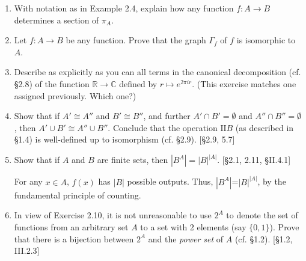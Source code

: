 \begin{enumerate}
    \item With notation as in Example 2.4, explain how any function $f: A \to B$ determines a section of $\pi_A$.

    \item Let $f: A \to B$ be any function. Prove that the graph $\Gamma_f$ of $f$ is isomorphic to $A$.

    \item Describe as explicitly as you can all terms in the canonical decomposition (cf. \S2.8) of the function $\mathbb{R} \to \mathbb{C}$ defined by $r \mapsto e^{2\pi i r}$. (This exercise matches one assigned previously. Which one?)

    \item Show that if $A' \cong A''$ and $B' \cong B''$, and further $A' \cap B' = \emptyset$ and $A'' \cap B'' = \emptyset$, then $A' \cup B' \cong A'' \cup B''$. Conclude that the operation $\text{II}B$ (as described in \S1.4) is well-defined up to isomorphism (cf. \S2.9). [\S2.9, 5.7]

    \item Show that if $A$ and $B$ are finite sets, then $|B^A| = |B|^{|A|}$. [\S2.1, 2.11, \S II.4.1]

          \begin{solution}
              For any $x\in A$, $f(x)$ has $|B|$ possible outputs. Thus, $|B^A|$=$|B|^{|A|}$, by the fundamental principle of counting.
          \end{solution}

    \item In view of Exercise 2.10, it is not unreasonable to use $2^A$ to denote the set of functions from an arbitrary set $A$ to a set with 2 elements (say $\{0,1\}$). Prove that there is a bijection between $2^A$ and the \textit{power set} of $A$ (cf. \S1.2). [\S1.2, III.2.3]

\end{enumerate}